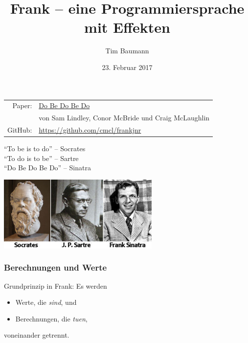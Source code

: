 \documentclass{beamer}
\title[Frank]{Frank -- eine Programmiersprache mit Effekten}
\author{Tim Baumann}
\institute[CCA]{Curry Club Augsburg}
\date{23. Februar 2017}
\begin{document}
\begin{frame}
  \titlepage
\end{frame}

\begin{frame}
  \begin{tabular}{r l}
    Paper: &
      \href{https://arxiv.org/abs/1611.09259}{Do Be Do Be Do} \\
      & von Sam Lindley, Conor McBride und Craig McLaughlin \\

    GitHub: & \url{https://github.com/cmcl/frankjnr} \\
  \end{tabular}
\end{frame}

\begin{frame}
  \begin{center}
    \huge
    "`To be is to do"' -- Socrates \\
    "`To do is to be"' -- Sartre \\
    "`Do Be Do Be Do"' -- Sinatra

    \vspace{1cm}
    \includegraphics[width=8cm]{socratessartresinatra}
  \end{center}
\end{frame}

\begin{frame}
  \frametitle{Berechnungen und Werte}

  Grundprinzip in Frank: Es werden
  \begin{itemize}
    \item Werte, die \textit{sind}, und
    \item Berechnungen, die \textit{tuen},
  \end{itemize}
  voneinander getrennt.
\end{frame}
\end{document}
